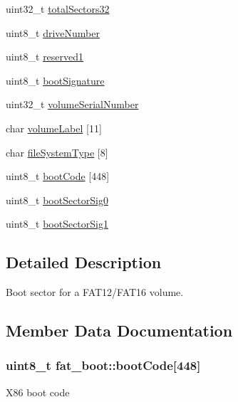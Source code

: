 \begin{DoxyCompactItemize}
\item 
uint32\+\_\+t \hyperlink{structfat__boot_addeb2dd8f78418edbf544303d44133e2}{total\+Sectors32}
\item 
uint8\+\_\+t \hyperlink{structfat__boot_aebd280b93563b75b9612d3db844b0d16}{drive\+Number}
\item 
uint8\+\_\+t \hyperlink{structfat__boot_affa7e6efb3ccea19ba7ea0ddadce7463}{reserved1}
\item 
uint8\+\_\+t \hyperlink{structfat__boot_a712dc388c530e91e4a692e7102d6bdc8}{boot\+Signature}
\item 
uint32\+\_\+t \hyperlink{structfat__boot_ac05e88a0d27f0340ba008834361d2b20}{volume\+Serial\+Number}
\item 
char \hyperlink{structfat__boot_a9ee733f1b1abc0210ec8f9676bba2218}{volume\+Label} \mbox{[}11\mbox{]}
\item 
char \hyperlink{structfat__boot_aee529e32908406866f3ec3c17c4632fa}{file\+System\+Type} \mbox{[}8\mbox{]}
\item 
uint8\+\_\+t \hyperlink{structfat__boot_acf9f5d9f61a6e680e11849f957ecf782}{boot\+Code} \mbox{[}448\mbox{]}
\item 
uint8\+\_\+t \hyperlink{structfat__boot_a7951b888af4f357b84dd40af2ef7f29d}{boot\+Sector\+Sig0}
\item 
uint8\+\_\+t \hyperlink{structfat__boot_afe8f58668ff594bb2022ce7c06b7726c}{boot\+Sector\+Sig1}
\end{DoxyCompactItemize}


\subsection{Detailed Description}
Boot sector for a F\+A\+T12/\+F\+A\+T16 volume. 

\subsection{Member Data Documentation}
\subsubsection[{\texorpdfstring{boot\+Code}{bootCode}}]{\setlength{\rightskip}{0pt plus 5cm}uint8\+\_\+t fat\+\_\+boot\+::boot\+Code\mbox{[}448\mbox{]}}\hypertarget{structfat__boot_acf9f5d9f61a6e680e11849f957ecf782}{}\label{structfat__boot_acf9f5d9f61a6e680e11849f957ecf782}
X86 boot code 
